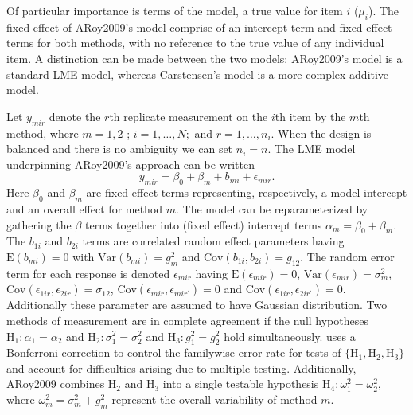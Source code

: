 \documentclass[12pt, a4paper]{report}
\theoremstyle{plain}
\theoremstyle{definition}
\theoremstyle{remark}
\begin{document}
	
	
	Of particular importance is terms of the model, a true value for item $i$ ($\mu_{i}$).  The fixed effect of ARoy2009's model comprise of an intercept term and fixed effect terms for both methods, with no reference to the true value of any individual item. A distinction can be made between the two models: ARoy2009's model is a standard LME model, whereas Carstensen's model is a more complex additive model.
	
	
	
	Let $y_{mir} $ denote the $r$th replicate measurement on the $i$th item by the $m$th method, where $m=1,2$ ; $i=1,\ldots,N;$ and $r = 1,\ldots,n_i.$ When the design is balanced and there is no ambiguity we can set $n_i=n.$ The LME model underpinning ARoy2009's approach can be written
	\begin{equation}\label{ARoy2009-model}
	y_{mir} = \beta_{0} + \beta_{m} + b_{mi} + \epsilon_{mir}.
	\end{equation}
	Here $\beta_0$ and $\beta_m$ are fixed-effect terms representing, respectively, a model intercept and an overall effect for method $m.$ The model can be reparameterized by gathering the $\beta$ terms together into (fixed effect) intercept terms $\alpha_m=\beta_0+\beta_m.$ The $b_{1i}$ and $b_{2i}$ terms are correlated random effect parameters having $\mathrm{E}(b_{mi})=0$ with $\mathrm{Var}(b_{mi})=g^2_m$ and $\mathrm{Cov}(b_{1i}, b_{2 i})=g_{12}.$ The random error term for each response is denoted $\epsilon_{mir}$ having $\mathrm{E}(\epsilon_{mir})=0$, $\mathrm{Var}(\epsilon_{mir})=\sigma^2_m$, $\mathrm{Cov}(\epsilon_{1ir}, \epsilon_{2 ir})=\sigma_{12}$, $\mathrm{Cov}(\epsilon_{mir}, \epsilon_{mir^\prime})= 0$ and $\mathrm{Cov}(\epsilon_{1ir}, \epsilon_{2 ir^\prime})= 0.$ Additionally these parameter are assumed to have Gaussian distribution. Two methods of measurement are in complete agreement if the null hypotheses $\mathrm{H}_1\colon \alpha_1 = \alpha_2$ and $\mathrm{H}_2\colon \sigma^2_1 = \sigma^2_2 $ and $\mathrm{H}_3\colon g^2_1= g^2_2$ hold simultaneously. \citet{ARoy2009} uses a Bonferroni correction to control the familywise error rate for tests of $\{\mathrm{H}_1, \mathrm{H}_2, \mathrm{H}_3\}$ and account for difficulties arising due to multiple testing. Additionally, ARoy2009 combines $\mathrm{H}_2$ and $\mathrm{H}_3$ into a single testable hypothesis $\mathrm{H}_4\colon \omega^2_1=\omega^2_2,$ where $\omega^2_m = \sigma^2_m + g^2_m$ represent the overall variability of method $m.$
	
\end{document}
